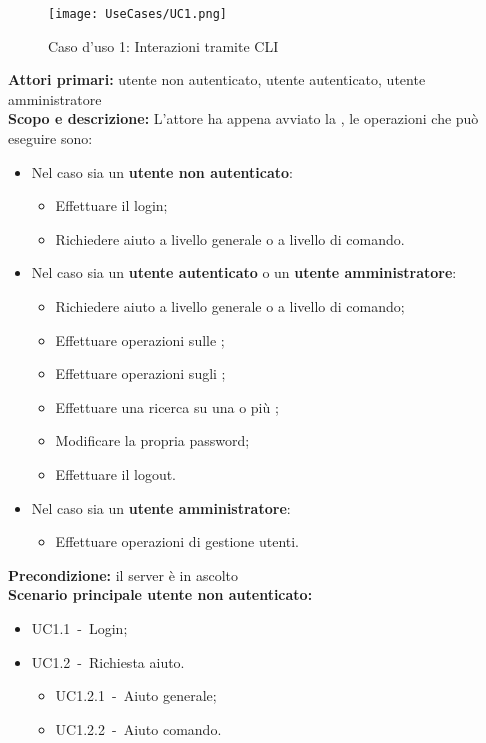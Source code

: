 \documentclass{scalatekids-article}
\begin{document}
\begin{figure}[H]
  \begin{center}
    \texttt{[image: UseCases/UC1.png]}
    \caption{Caso d'uso 1: Interazioni tramite CLI}
  \end{center}
\end{figure}
\textbf{Attori primari:} utente non autenticato, utente autenticato, utente amministratore\\
\textbf{Scopo e descrizione:} L'attore ha appena avviato la , le operazioni che può eseguire sono:
\begin{itemize}
\item Nel caso sia un \textbf{utente non autenticato}:
  \begin{itemize}
  \item Effettuare il login;
  \item Richiedere aiuto a livello generale o a livello di comando.
  \end{itemize}
\item Nel caso sia un \textbf{utente autenticato} o un \textbf{utente amministratore}:
  \begin{itemize}
  \item Richiedere aiuto a livello generale o a livello di comando;
  \item Effettuare operazioni sulle ;
  \item Effettuare operazioni sugli ;
  \item Effettuare una ricerca su una o più ;
  \item Modificare la propria password;
  \item Effettuare il logout.
  \end{itemize}
\item Nel caso sia un \textbf{utente amministratore}:
  \begin{itemize}
  \item Effettuare operazioni di gestione utenti.
  \end{itemize}
\end{itemize}
\textbf{Precondizione:} il server è in ascolto\\
\textbf{Scenario principale utente non autenticato:}
\begin{itemize}
\item UC1.1\ -\ Login;
\item UC1.2\ -\ Richiesta aiuto.
  \begin{itemize}
  \item UC1.2.1\ -\ Aiuto generale;
  \item UC1.2.2\ -\ Aiuto comando.
  \end{itemize}
\end{itemize}
\end{document}
